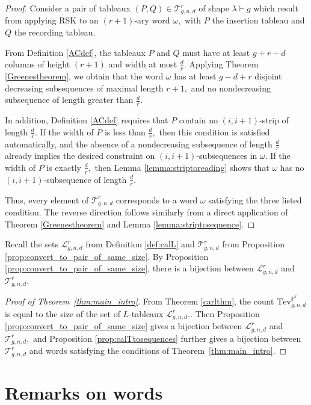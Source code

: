 \documentclass[12pt]{amsart}
\def\cL{\mathcal{L}}
\def\cT{\mathcal{T}}
\begin{document}
\begin{proof}
Consider a pair of tableaux $(P,Q)\in \cT_{g,n,d}^r$ of shape $\lambda\vdash g$ which result from applying RSK to an $(r+1)$-ary word $\omega,$ with $P$ the insertion tableau and $Q$ the recording tableau. 

From Definition \ref{ACdef}, the tableaux $P$ and $Q$ must have at least $g+r-d$ columns of height $(r+1)$ and width at most $\frac{d}{r}.$ Applying Theorem \ref{Greenestheorem}, we obtain that the word $\omega$ has at least $g-d+r$ disjoint decreasing subsequences of maximal length $r+1,$ and no nondecreasing subsequence of length greater than $\frac{d}{r}.$ 

In addition, Definition \ref{ACdef} requires that $P$ contain no $(i,i+1)$-strip of length $\frac{d}{r}.$ 
If the width of $P$ is less than $\frac{d}{r},$ then this condition is satisfied automatically, and the absence of a nondecreasing subsequence of length $\frac{d}{r}$ already implies the desired constraint on $(i,i+1)$-subsequences in $\omega.$ 
If the width of $P$ is exactly $\frac{d}{r},$ then Lemma \ref{lemma:striptoreading} shows that $\omega$ has no $(i,i+1)$-subsequence of length $\frac{d}{r}.$

Thus, every element of $\cT_{g,n,d}^r$ corresponds to a word $\omega$ satisfying the three listed condition. The reverse direction follows similarly from a direct application of Theorem \ref{Greenestheorem} and Lemma \ref{lemma:striptosequence}.
\end{proof}

Recall the sets $\cL_{g,n,d}^r$ from Definition \ref{def:calL} and $\cT_{g,n,d}^r$ from Proposition \ref{prop:convert_to_pair_of_same_size}. By Proposition \ref{prop:convert_to_pair_of_same_size}, there is a bijection between $\cL_{g,n,d}^r$ and $\cT_{g,n,d}^r.$


\begin{proof}[Proof of Theorem~\ref{thm:main_intro}]
From Theorem \ref{carlthm}, the count $\text{Tev}_{g,n,d}^{\mathbb{P}^r}$ is equal to the size of the set of $L$-tableaux $\cL_{g,n,d}^r.$. Then Proposition \ref{prop:convert_to_pair_of_same_size} gives a bijection between $\cL_{g,n,d}^r$ and $\cT_{g,n,d}^r,$ and Proposition \ref{prop:calTtosequences} further gives a bijection between $\cT_{g,n,d}^r$ and words satisfying the conditions of Theorem~\ref{thm:main_intro}.
\end{proof}

\section{Remarks on words}\label{sec:remarks}
\end{document}
